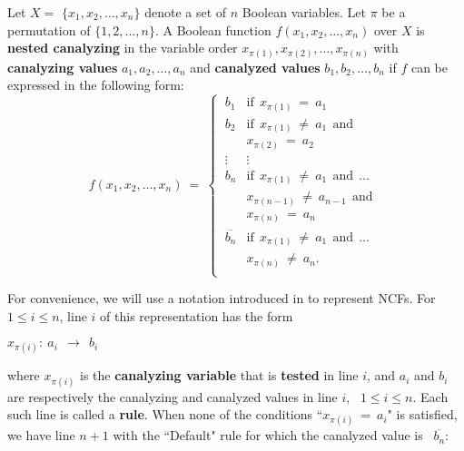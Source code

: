 \begin{definition}\label{def:nested_canalyzing}
Let $X = $ $\{x_1, x_2, \ldots, x_n\}$ denote a set of $n$  Boolean variables.
Let $\pi$ be a permutation of $\{1, 2, \ldots, n\}$.
A Boolean function $f(x_1, x_2, \ldots, x_n)$ over $X$ is \textbf{nested canalyzing}
in the variable order $x_{\pi(1)}, x_{\pi(2)}, \ldots, x_{\pi(n)}$ with
\textbf{canalyzing values} $a_1, a_2, \ldots, a_n$ and 
\textbf{canalyzed values} $b_1, b_2, \ldots, b_n$ 
if $f$ can be expressed in the following form:
\[
f(x_1, x_2, \ldots, x_n) ~=~ 
   \begin{cases}
       \:b_1 & \mathrm{if~~} x_{\pi(1)} ~=~ a_1 \\
       \:b_2 & \mathrm{if~~} x_{\pi(1)} ~\neq~ a_1 \mathrm{~~and~~}\\
             & x_{\pi(2)} ~=~ a_2 \\
       \:\vdots & \vdots \\ %
       \:b_n & \mathrm{if~~} x_{\pi(1)} ~\neq~ a_1 \mathrm{~~and~~} \ldots \\
             & x_{\pi(n-1)} ~\neq~ a_{n-1} \mathrm{~~and~~}\\
             & x_{\pi(n)} ~=~ a_n \\ %
       \:\overline{b_n} & \mathrm{if~~} x_{\pi(1)} ~\neq~ a_1 \mathrm{~~and~~} \ldots\\
                        & x_{\pi(n)} ~\neq~ a_n. \\
   \end{cases}
\]
\end{definition}
For convenience, we will use a notation introduced in \cite{Stearns-etal-2018}
to represent NCFs.
For $1 \leq i \leq n$, line $i$ of this representation has the form

\medskip

\noindent
\hspace*{0.5in} $x_{\pi(i)}:~ a_i ~~\longrightarrow~~ b_i$

\medskip

\noindent 
where $x_{\pi(i)}$ is the \textbf{canalyzing variable} that is
\textbf{tested} in line $i$, 
and $a_i$ and $b_i$ are respectively the canalyzing and 
canalyzed values in line $i$,~ $1 \leq i \leq n$.
Each such line is called a \textbf{rule}.
When none of the conditions ``$x_{\pi(i)} ~=~ a_i$" 
is satisfied, we have line $n+1$ with the ``Default" rule
for which the canalyzed value is~ $\overline{b_n}$: 

\medskip

